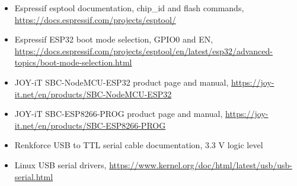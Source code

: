 \begin{itemize}
\item Espressif esptool documentation, chip\_id and flash commands, \url{https://docs.espressif.com/projects/esptool/}
\item Espressif ESP32 boot mode selection, GPIO0 and EN, \url{https://docs.espressif.com/projects/esptool/en/latest/esp32/advanced-topics/boot-mode-selection.html}
\item JOY-iT SBC-NodeMCU-ESP32 product page and manual, \url{https://joy-it.net/en/products/SBC-NodeMCU-ESP32}
\item JOY-iT SBC-ESP8266-PROG product page and manual, \url{https://joy-it.net/en/products/SBC-ESP8266-PROG}
\item Renkforce USB to TTL serial cable documentation, 3.3 V logic level
\item Linux USB serial drivers, \url{https://www.kernel.org/doc/html/latest/usb/usb-serial.html}
\end{itemize}
